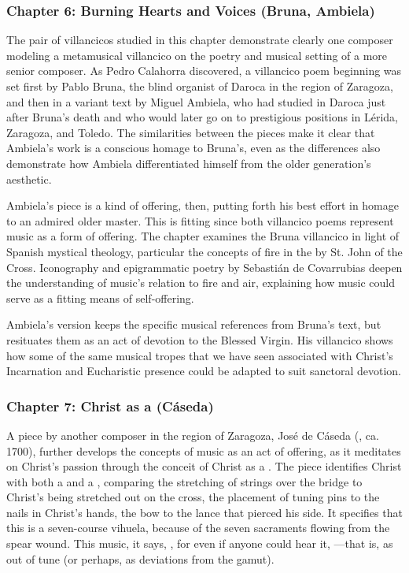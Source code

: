 \documentclass{vcbook-proposal}
\begin{document}
\subsubsection{Chapter 6: Burning Hearts and Voices (Bruna, Ambiela)}

The pair of villancicos studied in this chapter demonstrate clearly one composer modeling a metamusical villancico on the poetry and musical setting of a more senior composer.
As Pedro Calahorra discovered, a villancico poem beginning  was set first by Pablo Bruna, the blind organist of Daroca in the region of Zaragoza, and then in a variant text by Miguel Ambiela, who had studied in Daroca just after Bruna's death and who would later go on to prestigious positions in Lérida, Zaragoza, and Toledo.
The similarities between the pieces make it clear that Ambiela's work is a conscious homage to Bruna's, even as the differences also demonstrate how Ambiela differentiated himself from the older generation's aesthetic. 

Ambiela's piece is a kind of offering, then, putting forth his best effort in homage to an admired older master.
This is fitting since both villancico poems represent music as a form of offering.
The chapter examines the Bruna villancico in light of Spanish mystical theology, particular the concepts of fire in the  by St. John of the Cross.
Iconography and epigrammatic poetry by Sebastián de Covarrubias deepen the understanding of music's relation to fire and air, explaining how music could serve as a fitting means of self-offering.

Ambiela's version keeps the specific musical references from Bruna's text, but resituates them as an act of devotion to the Blessed Virgin.
His villancico shows how some of the same musical tropes that we have seen associated with Christ's Incarnation and Eucharistic presence could be adapted to suit sanctoral devotion. 

\subsubsection{Chapter 7: Christ as a  (Cáseda)}

A piece by another composer in the region of Zaragoza, José de Cáseda (, ca. 1700), further develops the concepts of music as an act of offering, as it meditates on Christ's passion through the conceit of Christ as a . 
The piece identifies Christ with both a  and a , comparing the stretching of strings over the bridge to Christ's being stretched out on the cross, the placement of tuning pins to the nails in Christ's hands, the bow to the lance that pierced his side.
It specifies that this is a seven-course vihuela, because of the seven sacraments flowing from the spear wound.
This music, it says, , for even if anyone could hear it, ---that is, as out of tune (or perhaps, as  deviations from the gamut). 
\end{document}
